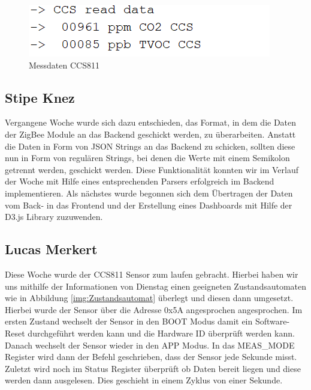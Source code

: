 \documentclass[]{article}
\begin{document}
\begin{figure}[!h]
	\centering
	\includegraphics[scale=0.60]{images/CCS811_data}
	\caption{Messdaten CCS811}
	\label{img:CCS811_data}
\end{figure}





\subsection{Stipe Knez}
Vergangene Woche wurde sich dazu entschieden, das Format, in dem die Daten der ZigBee Module an das Backend geschickt werden, zu überarbeiten. Anstatt die Daten in Form von JSON Strings an das Backend zu schicken, sollten diese nun in Form von regulären Strings, bei denen die Werte mit einem Semikolon getrennt werden, geschickt werden. Diese Funktionalität konnten wir im Verlauf der Woche mit Hilfe eines entsprechenden Parsers erfolgreich im Backend implementieren. Als nächstes wurde begonnen sich dem Übertragen der Daten vom Back- in das Frontend und der Erstellung eines Dashboards mit Hilfe der D3.js Library zuzuwenden.
\subsection{Lucas Merkert}
Diese Woche wurde der CCS811 Sensor zum laufen gebracht. Hierbei haben wir uns mithilfe der Informationen von Dienstag einen geeigneten Zustandsautomaten wie in Abbildung \ref{img:Zustandsautomat} überlegt und diesen dann umgesetzt. Hierbei wurde der Sensor über die Adresse 0x5A angesprochen angesprochen. Im ersten Zustand wechselt der Sensor in den BOOT Modus damit ein Software-Reset durchgeführt werden kann und die Hardware ID überprüft werden kann. Danach wechselt der Sensor wieder in den APP Modus. In das MEAS\_MODE Register wird dann der Befehl geschrieben, dass der Sensor jede Sekunde misst. Zuletzt wird noch im Status Register überprüft ob Daten bereit liegen und diese werden dann ausgelesen. Dies geschieht in einem Zyklus von einer Sekunde.
\end{document}
